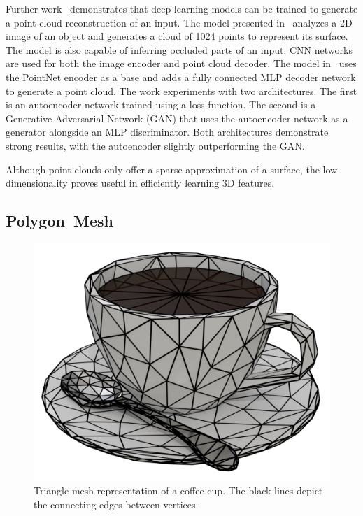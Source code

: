 Further work~\cite{Fan2017, Achlioptas2018} demonstrates that deep learning models can be trained to generate a point cloud reconstruction of an input. The model presented in~\cite{Fan2017} analyzes a 2D image of an object and generates a cloud of 1024 points to represent its surface. The model is also capable of inferring occluded parts of an input. CNN networks are used for both the image encoder and point cloud decoder. The model in~\cite{Achlioptas2018} uses the PointNet encoder as a base and adds a fully connected MLP decoder network to generate a point cloud. The work experiments with two architectures. The first is an autoencoder network trained using a loss function. The second is a Generative Adversarial Network (GAN) that uses the autoencoder network as a generator alongside an MLP discriminator. Both architectures demonstrate strong results, with the autoencoder slightly outperforming the GAN.

Although point clouds only offer a sparse approximation of a surface, the low-dimensionality proves useful in efficiently learning 3D features.


\subsection{Polygon~Mesh}
\label{subsec:polygon_mesh}

\begin{figure}[ht]
	\centering
	\includegraphics[scale=0.2]{Images/Mesh Cup}
	\caption{Triangle mesh representation of a coffee cup. The black lines depict the connecting edges between vertices.}
	\label{fig:mesh_cup}
\end{figure}

